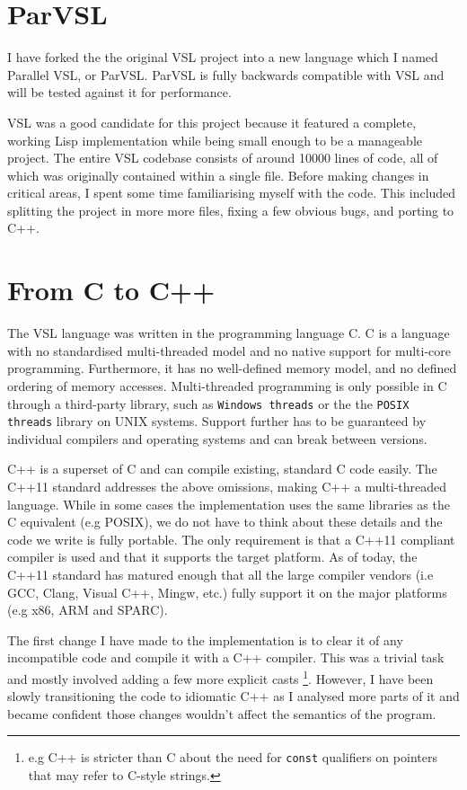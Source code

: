 \section{ParVSL}
I have forked the the original VSL project into a new language which I named Parallel VSL, or ParVSL.
ParVSL is fully backwards compatible with VSL and will be tested against it for performance.

VSL was a good candidate for this project because it featured a complete, working Lisp implementation while being
small enough to be a manageable project. The entire VSL codebase consists of around 10000 lines of code, all of which
was originally contained within a single file. Before making changes in critical areas, I spent some time familiarising
myself with the code. This included splitting the project in more more files, fixing a few obvious bugs, and porting
to C++.

\section{From C to C++}
The VSL language was written in the programming language C. C is a language with no standardised
multi-threaded model and no native support for multi-core programming. Furthermore, it has no well-defined
memory model, and no defined ordering of memory accesses. Multi-threaded programming
is only possible in C through a third-party library, such as \texttt{Windows threads} or the
the \texttt{POSIX threads} library on UNIX systems. Support further has to be guaranteed by individual compilers
and operating systems and can break between versions.

C++ is a superset of C and can compile existing, standard C code easily. The C++11 standard addresses the
above omissions, making C++ a multi-threaded language. While in some cases the implementation uses the same
libraries as the C equivalent (e.g POSIX), we do not have to think about these details and the code
we write is fully portable. The only requirement is that a C++11 compliant compiler is used and that it supports
the target platform. As of today, the C++11 standard has matured enough
that all the large compiler vendors (i.e GCC, Clang, Visual C++, Mingw, etc.) fully support it on the
major platforms (e.g x86, ARM and SPARC).

The first change I have made to the implementation is to clear it of any incompatible code and compile it
with a C++ compiler. This was a trivial task and mostly involved adding a few more explicit casts
\footnote{e.g C++ is stricter than C about the need for \texttt{const} qualifiers on pointers that
may refer to C-style strings.}.
However, I have been slowly transitioning the code to idiomatic C++ as I analysed more parts of it
and became confident those changes wouldn't affect the semantics of the program.


